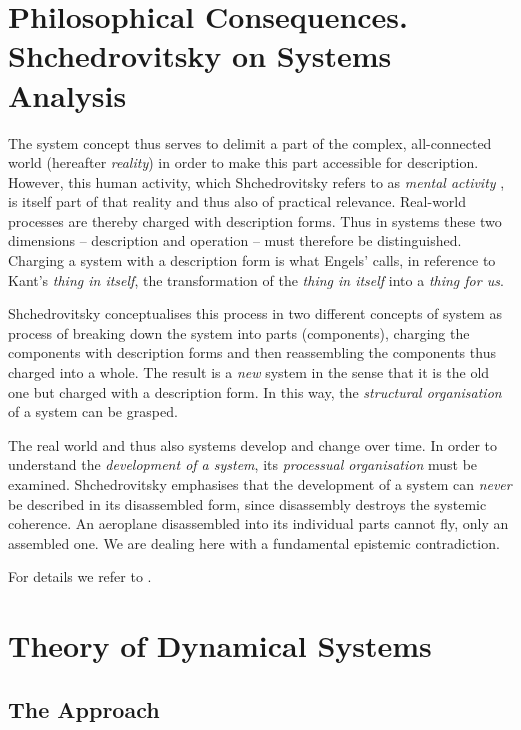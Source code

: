 \documentclass[11pt,a4paper]{article}
\begin{document}
\section{Philosophical Consequences.\\ Shchedrovitsky on Systems Analysis}

The system concept thus serves to delimit a part of the complex, all-connected
world (hereafter \emph{reality}) in order to make this part accessible for
description. However, this human activity, which Shchedrovitsky refers to as
\emph{mental activity} \cite[p. 47]{MSM}, is itself part of that reality and
thus also of practical relevance. Real-world processes are thereby charged
with description forms. Thus in systems these two dimensions -- description
and operation -- must therefore be distinguished. Charging a system with a
description form is what Engels' calls, in reference to Kant's \emph{thing in
  itself}, the transformation of the \emph{thing in itself} into a \emph{thing
  for us}.

Shchedrovitsky \cite[p. 80 ff.]{MSM} conceptualises this process in two
different concepts of system \cite[pp. 89 and 98]{MSM} as process of breaking
down the system into parts (components), charging the components with
description forms and then reassembling the components thus charged into a
whole.  The result is a \emph{new} system in the sense that it is the old one
but charged with a description form.  In this way, the \emph{structural
  organisation} of a system can be grasped.

The real world and thus also systems develop and change over time. In order to
understand the \emph{development of a system}, its \emph{processual
  organisation} must be examined.  Shchedrovitsky emphasises that the
development of a system can \emph{never} be described in its disassembled
form, since disassembly destroys the systemic coherence. An aeroplane
disassembled into its individual parts cannot fly, only an assembled one. We
are dealing here with a fundamental epistemic contradiction.

For details we refer to \cite{MSM}.

\section{Theory of Dynamical Systems}

\subsection{The Approach}
\end{document}
